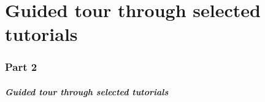 \part{Guided tour through selected tutorials}

\section*{Part 2}
\begin{frame}
  \frametitle{Guided tour through selected tutorials}
  \tableofcontents[hideallsubsections]
\end{frame}

%

%




%
%


